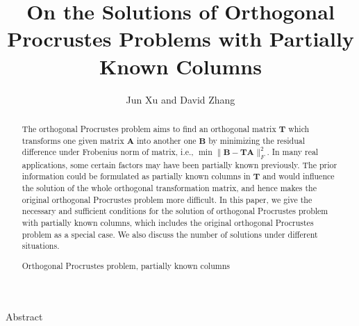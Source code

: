 \documentclass[titlepage,11pt,twoside]{article}
\begin{document}

\title{On the Solutions of Orthogonal Procrustes Problems with Partially Known Columns}

\author{Jun Xu and David Zhang }






\begin{center}\vskip3pt


\vspace{32pt}

Abstract\vskip3pt

\end{center}


\begin{abstract}
The orthogonal Procrustes problem aims to find an orthogonal matrix $\mathbf{T}$ which transforms one given matrix $\mathbf{A}$ into another one $\mathbf{B}$ by minimizing the residual difference under Frobenius norm of matrix, i.e., $\min\|\mathbf{B}-\mathbf{T}\mathbf{A}\|_{F}^{2}$. In many real applications, some certain factors may have been partially known previously. The prior information could be formulated as partially known columns in $\mathbf{T}$ and would influence the solution of the whole orthogonal transformation matrix, and hence makes the original orthogonal Procrustes problem more difficult. In this paper, we give the necessary and sufficient conditions for the solution of orthogonal Procrustes problem with partially known columns, which includes the original orthogonal Procrustes problem as a special case. We also discuss the number of solutions under different situations.
\begin{keywords}
Orthogonal Procrustes problem, partially known columns
\end{keywords}
\end{abstract}
\end{document}
